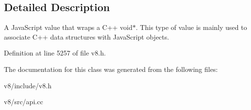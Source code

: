 \subsection{Detailed Description}
A Java\+Script value that wraps a C++ void$\ast$. This type of value is mainly used to associate C++ data structures with Java\+Script objects. 

Definition at line 5257 of file v8.\+h.



The documentation for this class was generated from the following files\+:\begin{DoxyCompactItemize}
\item 
v8/include/v8.\+h\item 
v8/src/api.\+cc\end{DoxyCompactItemize}
